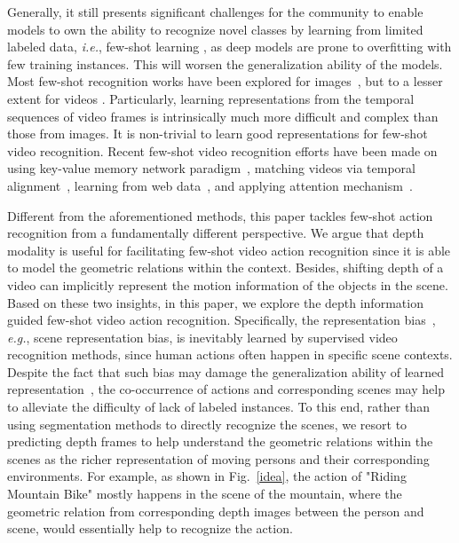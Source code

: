 \documentclass[sigconf]{acmart}
\def\ie{\textit{i.e.}}
\begin{document}
	
	Generally, it still presents significant challenges for the community to enable models to own the ability to recognize novel classes by learning from limited labeled data, \ie, few-shot learning \cite{siamese_1shot, matchingnet_1shot,relation_net}, as deep models are prone to overfitting with few training instances. This will worsen the generalization ability of the models.
	Most few-shot recognition works have been explored for images~\cite{chen2018image,compositional_1shot,prototype_network,relation_net,wang2020instance,wang2020trust}, but to a lesser extent for videos
	\cite{zhu2018compound,zhang2020few}. Particularly,  learning representations from the temporal sequences of video frames is intrinsically much more difficult and complex than those from images. It is non-trivial to learn good representations for few-shot video recognition. Recent few-shot video recognition efforts have been made on using key-value memory network paradigm~\cite{zhu2018compound}, matching videos via temporal alignment~\cite{cao2019few}, learning from web data~\cite{tu2019learning}, and applying attention mechanism~\cite{zhang2020few}. 
	
	
	
	Different from the aforementioned methods, this paper tackles few-shot action recognition from a fundamentally different perspective. 
	We argue that depth modality is useful for facilitating few-shot video action recognition since it is able to model the geometric relations within the context. Besides, shifting depth of a video can implicitly represent the motion information of the objects in the scene. Based on these two insights, in this paper, we explore the depth information guided few-shot video action recognition.
	Specifically, the representation bias~\cite{resound}, \textit{e.g.}, scene representation bias, is inevitably learned by supervised video recognition methods, since human actions often happen in specific scene contexts. Despite the fact that such bias may damage the generalization ability of learned representation~\cite{dance_in_the_mall},  the co-occurrence of actions and corresponding scenes may help to alleviate the difficulty of lack of labeled instances.  To this end, rather than using segmentation methods to directly recognize the scenes, we resort to predicting depth frames to help understand the geometric relations within the scenes as the richer representation of moving persons and their corresponding environments. For example, as shown in Fig.~\ref{idea}, the action of "Riding Mountain Bike" mostly happens in the scene of the mountain, where the geometric relation from corresponding depth images between the person and scene, would essentially help to recognize the action. 
	
\end{document}
